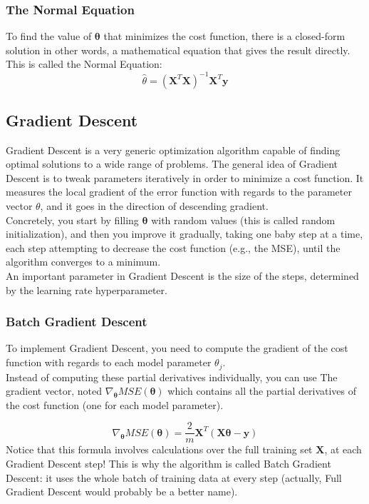 \documentclass[french]{article}
\begin{document}
\subsubsection{The Normal Equation}
To find the value of $\bm{\theta}$ that minimizes the cost function, there is a closed-form solution in other words, a mathematical equation that gives the result directly. This is called the Normal Equation:
\[\hat \theta = (\bm{X}^T \bm{X})^{-1}\bm{X}^T \bm{y}\]

\subsection{Gradient Descent}

Gradient Descent is a very generic optimization algorithm capable of finding optimal solutions to a wide range of problems. The general idea of Gradient Descent is to tweak parameters iteratively in order to minimize a cost function. It measures the local gradient of the error function with regards to the parameter vector $\theta$, and it goes in the direction of descending gradient.\\

Concretely, you start by filling $\bm{\theta}$ with random values (this is called random initialization), and then you improve it gradually, taking one baby step at a time, each step attempting to decrease the cost function (e.g., the MSE), until the algorithm converges to a minimum. \\

An important parameter in Gradient Descent is the size of the steps, determined by the learning rate hyperparameter.

\subsubsection{Batch Gradient Descent}

To implement Gradient Descent, you need to compute the gradient of the cost function with regards to each model parameter $\theta_j$.\\

Instead of computing these partial derivatives individually, you can use The gradient vector, noted $\nabla_{\bm{\theta}}MSE(\bm{\theta})$ which contains all the
partial derivatives of the cost function (one for each model parameter).

\[\nabla_{\bm{\theta}}MSE(\bm{\theta}) = \frac{2}{m} \bm{X}^T(\bm{X \theta - y}) \]
Notice that this formula involves calculations over the full training set $\bm{X}$, at each Gradient Descent step! This is why the algorithm is called Batch Gradient Descent: it uses the whole batch of training data at every step (actually, Full Gradient Descent would probably be a better name).
\end{document}
